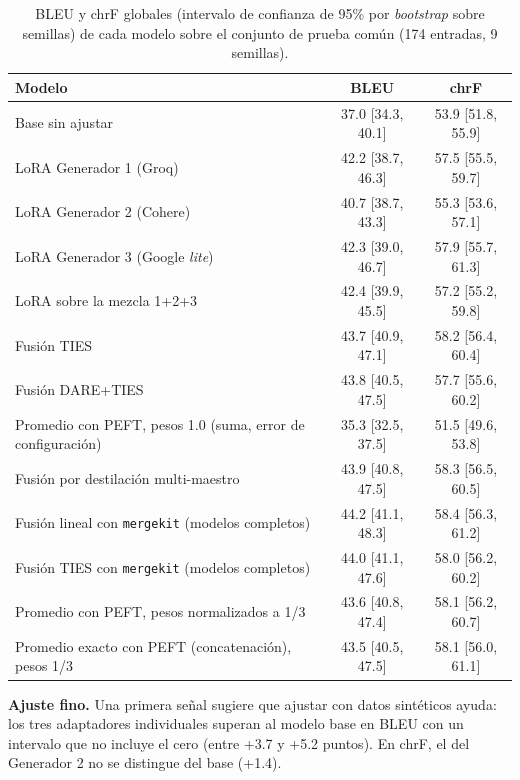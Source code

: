 \documentclass[11pt,a4paper]{article}
\begin{document}
\begin{table}[ht]
\centering
\small
\begin{tabular}{lcc}
\toprule
\textbf{Modelo} & \textbf{BLEU} & \textbf{chrF} \\
\midrule
Base sin ajustar & 37.0 [34.3, 40.1] & 53.9 [51.8, 55.9] \\
\midrule
LoRA Generador 1 (Groq) & 42.2 [38.7, 46.3] & 57.5 [55.5, 59.7] \\
LoRA Generador 2 (Cohere) & 40.7 [38.7, 43.3] & 55.3 [53.6, 57.1] \\
LoRA Generador 3 (Google \textit{lite}) & 42.3 [39.0, 46.7] & 57.9 [55.7, 61.3] \\
LoRA sobre la mezcla 1+2+3 & 42.4 [39.9, 45.5] & 57.2 [55.2, 59.8] \\
\midrule
Fusión TIES & 43.7 [40.9, 47.1] & 58.2 [56.4, 60.4] \\
Fusión DARE+TIES & 43.8 [40.5, 47.5] & 57.7 [55.6, 60.2] \\
Promedio con PEFT, pesos 1.0 (suma, error de configuración) & 35.3 [32.5, 37.5] & 51.5 [49.6, 53.8] \\
Fusión por destilación multi-maestro & 43.9 [40.8, 47.5] & 58.3 [56.5, 60.5] \\
Fusión lineal con \texttt{mergekit} (modelos completos) & 44.2 [41.1, 48.3] & 58.4 [56.3, 61.2] \\
Fusión TIES con \texttt{mergekit} (modelos completos) & 44.0 [41.1, 47.6] & 58.0 [56.2, 60.2] \\
Promedio con PEFT, pesos normalizados a 1/3 & 43.6 [40.8, 47.4] & 58.1 [56.2, 60.7] \\
Promedio exacto con PEFT (concatenación), pesos 1/3 & 43.5 [40.5, 47.5] & 58.1 [56.0, 61.1] \\
\bottomrule
\end{tabular}
\caption{BLEU y chrF globales (intervalo de confianza de 95\% por \textit{bootstrap} sobre semillas) de cada modelo sobre el conjunto de prueba común (174 entradas, 9 semillas).}
\label{tab:resultados-fase3}
\end{table}

\textbf{Ajuste fino.} Una primera señal sugiere que ajustar con datos sintéticos ayuda: los tres adaptadores individuales superan al modelo base en BLEU con un intervalo que no incluye el cero (entre +3.7 y +5.2 puntos). En chrF, el del Generador 2 no se distingue del base (+1.4).
\end{document}

